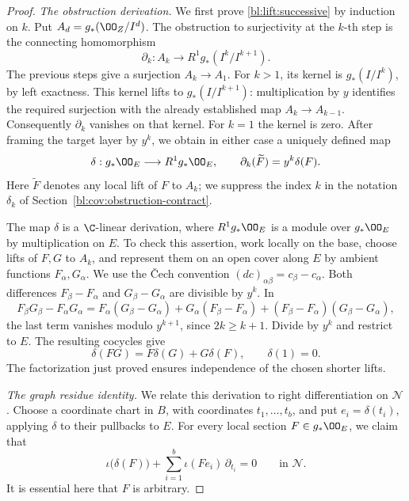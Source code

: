 \begin{proof}
\emph{The obstruction derivation.}
We first prove \eqref{bl:lift:successive} by induction on \(k\).
Put \(A_d=g_*(\OO_Z/I^d)\).  The obstruction to surjectivity at the
\(k\)-th step is the connecting homomorphism
\[
 \partial_k:A_k\longrightarrow R^1g_*(I^k/I^{k+1}).
\]
The previous steps give a surjection \(A_k\to A_1\).  For \(k>1\), its
kernel is \(g_*(I/I^k)\), by left exactness.  This kernel lifts to
\(g_*(I/I^{k+1})\): multiplication by \(y\) identifies the required
surjection with the already established map \(A_k\to A_{k-1}\).
Consequently \(\partial_k\) vanishes on that kernel.  For \(k=1\) the
kernel is zero.  After framing the target layer by \(y^k\), we obtain in
either case a uniquely defined map
\begin{equation}\label{bl:lift:derivation}
 \delta:g_*\OO_E\longrightarrow R^1g_*\OO_E,
 \qquad
 \partial_k(\widetilde F)=y^k\delta(F).
\end{equation}
Here \(\widetilde F\) denotes any local lift of \(F\) to \(A_k\);
we suppress the index \(k\) in the notation \(\delta_k\) of
Section~\ref{bl:cov:obstruction-contract}.

The map \(\delta\) is a \(\C\)-linear derivation, where
\(R^1g_*\OO_E\) is a module over \(g_*\OO_E\) by multiplication on
\(E\).  To check this assertion, work locally on the base, choose lifts
of \(F,G\) to \(A_k\), and represent them on an open cover along \(E\)
by ambient functions \(F_\alpha,G_\alpha\).  We use the \v{C}ech
convention \((dc)_{\alpha\beta}=c_\beta-c_\alpha\).
Both differences \(F_\beta-F_\alpha\) and
\(G_\beta-G_\alpha\) are divisible by \(y^k\).  In
\[
 F_\beta G_\beta-F_\alpha G_\alpha
 =F_\alpha(G_\beta-G_\alpha)
  +G_\alpha(F_\beta-F_\alpha)
  +(F_\beta-F_\alpha)(G_\beta-G_\alpha),
\]
the last term vanishes modulo \(y^{k+1}\), since \(2k\geq k+1\).
Divide by \(y^k\) and restrict to \(E\).  The resulting cocycles give
\begin{equation}\label{bl:lift:leibniz}
 \delta(FG)=F\delta(G)+G\delta(F),\qquad \delta(1)=0.
\end{equation}
The factorization just proved ensures independence of the chosen shorter
lifts.

\smallskip\noindent
\emph{The graph residue identity.}
We relate this derivation to right differentiation on \(\mathcal N\).
Choose a coordinate chart in \(B\), with coordinates
\(t_1,\ldots,t_b\), and put \(e_i=\delta(t_i)\), applying \(\delta\)
to their pullbacks to \(E\).  For every local section
\(F\in g_*\OO_E\), we claim that
\begin{equation}\label{bl:lift:variable-identity}
 \iota\bigl(\delta(F)\bigr)
   +\sum_{i=1}^b\iota(Fe_i)\,\partial_{t_i}=0
 \qquad\text{in }\mathcal N.
\end{equation}
It is essential here that \(F\) is arbitrary.


\end{proof}
